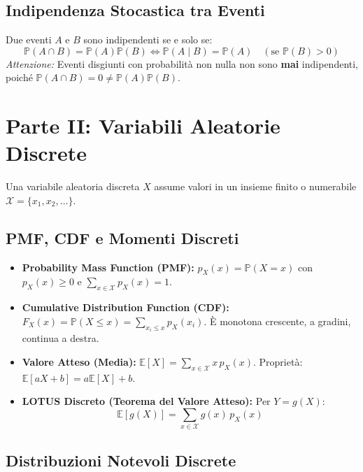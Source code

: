 \documentclass[a4paper, 10pt]{article}
\begin{document}
\subsection{Indipendenza Stocastica tra Eventi}
Due eventi $A$ e $B$ sono indipendenti se e solo se:
\[ \mathbb{P}(A \cap B) = \mathbb{P}(A)\mathbb{P}(B) \iff \mathbb{P}(A \mid B) = \mathbb{P}(A) \quad (\text{se } \mathbb{P}(B) > 0) \]
\textit{Attenzione:} Eventi disgiunti con probabilità non nulla non sono \textbf{mai} indipendenti, poiché $\mathbb{P}(A \cap B) = 0 \neq \mathbb{P}(A)\mathbb{P}(B)$.

\section{Parte II: Variabili Aleatorie Discrete}

Una variabile aleatoria discreta $X$ assume valori in un insieme finito o numerabile $\mathcal{X} = \{x_1, x_2, \dots\}$.

\subsection{PMF, CDF e Momenti Discreti}
\begin{itemize}
    \item \textbf{Probability Mass Function (PMF):} $p_X(x) = \mathbb{P}(X = x)$ con $p_X(x) \ge 0$ e $\sum_{x \in \mathcal{X}} p_X(x) = 1$.
    \item \textbf{Cumulative Distribution Function (CDF):} $F_X(x) = \mathbb{P}(X \le x) = \sum_{x_i \le x} p_X(x_i)$. È monotona crescente, a gradini, continua a destra.
    \item \textbf{Valore Atteso (Media):} $\mathbb{E}[X] = \sum_{x \in \mathcal{X}} x \, p_X(x)$. Proprietà: $\mathbb{E}[aX + b] = a\mathbb{E}[X] + b$.
    \item \textbf{LOTUS Discreto (Teorema del Valore Atteso):} Per $Y = g(X)$:
    \[ \mathbb{E}[g(X)] = \sum_{x \in \mathcal{X}} g(x) \, p_X(x) \]
\end{itemize}

\subsection{Distribuzioni Notevoli Discrete}
\end{document}
